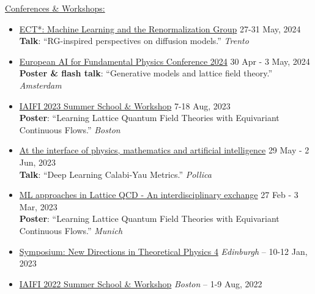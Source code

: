 \documentclass[11pt, a4paper]{article}
\newcommand{\dateright}[1]{\hfill{\small\color{accentblue} #1}}
\begin{document}
\underline{Conferences \& Workshops:}

\begin{itemize}[resume, itemsep=5pt]
    \item {\href{https://indico.ectstar.eu/event/206/contributions/4799/}{ECT*: Machine Learning and the Renormalization Group}} \dateright{ 27-31 May, 2024} \\
    {\footnotesize \textbf{Talk}: “RG-inspired perspectives on diffusion models.”} \dateright{{\color{black}\textit{Trento}}}

    \item {\href{https://indico.nikhef.nl/event/4875/contributions/20373/}{European AI for Fundamental Physics Conference 2024}} \dateright{ 30 Apr - 3 May, 2024} \\
    {\footnotesize \textbf{Poster \& flash talk}: “Generative models and lattice field theory.”} \dateright{{\color{black}\textit{Amsterdam} }}

    \item {\href{https://iaifi.org/past-workshops.html}{IAIFI 2023 Summer School \& Workshop}} \dateright{ 7-18 Aug, 2023} \\
    {\footnotesize \textbf{Poster}: “Learning Lattice Quantum Field Theories with Equivariant Continuous Flows.”} \dateright{{\color{black}\textit{Boston}}}

    \item {\href{https://agenda.infn.it/event/33851/}{At the interface of physics, mathematics and artificial intelligence}} \dateright{ 29 May - 2 Jun, 2023} \\
    {\footnotesize \textbf{Talk}: “Deep Learning Calabi-Yau Metrics.”} \dateright{{\color{black}\textit{Pollica}}}

    \item {\href{https://indico.ph.tum.de/event/7116/}{ML approaches in Lattice QCD - An interdisciplinary exchange}} \dateright{ 27 Feb - 3 Mar, 2023} \\
    {\footnotesize \textbf{Poster}: “Learning Lattice Quantum Field Theories with Equivariant Continuous Flows.”} \dateright{{\color{black}\textit{Munich}}}

    \item {\href{https://indico.ph.ed.ac.uk/event/124/}{Symposium: New Directions in Theoretical Physics 4}} \dateright{{\color{black}\textit{Edinburgh} -- } 10-12 Jan, 2023}

    \item {\href{https://iaifi.org/past-workshops.html}{IAIFI 2022 Summer School \& Workshop}} \dateright{{\color{black}\textit{Boston} --} 1-9 Aug, 2022}


\end{itemize}
\end{document}
